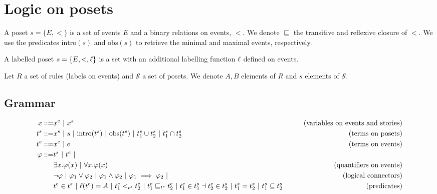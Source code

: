 \section{Logic on posets}

\begin{definition}[Poset]
  \label{def:poset}
  A poset $s=\{E,<\}$ is a set of events $E$ and a binary relations on events, $<$. We denote $\sqsubseteq$ the transitive and reflexive closure of $<$.
  We use the predicates $\text{intro}(s)$ and $\text{obs}(s)$ to retrieve the minimal and maximal events, respectively.

  A labelled poset $s=\{E,<,\ell\}$ is a set with an additional labelling function $\ell$ defined on events.
\end{definition}



Let $R$ a set of rules (labels on events) and $\mathcal{S}$ a set of posets.
We denote $A,B$ elements of $R$ and $s$ elements of $\mathcal{S}$.

\subsection{Grammar}

\begin{align*}
  x ::= & x^e ~|~ x^s & \tag{variables on events and stories} \\
  t^s ::= & x^s ~|~ s ~|~ \text{intro}(t^s) ~|~ \text{obs}(t^s) ~|~ t^s_1 \cup t^s_2 ~|~ t^s_1 \cap t^s_2 &\tag{terms on posets} \\
  t^e ::= & x^e ~|~ e & \tag{terms on events}
  \\
  \varphi ::= & t^s ~|~ t^e ~| \\
  & \exists x.\varphi(x) ~|~ \forall x.\varphi(x) ~|&\tag{quantifiers on events}\\
  & \neg \varphi ~|~ \varphi_1 \vee \varphi_2~|~\varphi_1 \wedge \varphi_2~|~\varphi_1 \implies \varphi_2~|&\tag{logical connectors}\\
  & t^e\in t^s ~|~ \ell(t^e) = A ~|~ t^e_1 <_{t^s} t^e_2 ~|~ t^e_1 \sqsubseteq_{t^s} t^e_2 ~|~ t^e_1\in t^s_1 \dashv t^e_2\in t^s_2~|~ t^s_1 = t^s_2 ~|~ t^s_1\subseteq t^s_2
  & \tag{predicates}\\
  \\
\end{align*}

